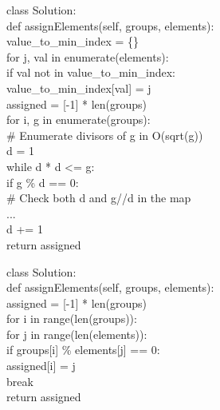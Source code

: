 \begin{tcolorbox}[
    colback=green!5,
    colframe=green!60!black,
    title={\textbf{Pairwise-Selected Solution (idx=12): Correct \checkmark}},
    coltitle=white,
    fonttitle=\small\bfseries,
    breakable,
    enhanced
]
\small\ttfamily
class Solution:\\
\quad def assignElements(self, groups, elements):\\
\quad\quad value\_to\_min\_index = \{\}\\
\quad\quad for j, val in enumerate(elements):\\
\quad\quad\quad if val not in value\_to\_min\_index:\\
\quad\quad\quad\quad value\_to\_min\_index[val] = j\\
\quad\quad assigned = [-1] * len(groups)\\
\quad\quad for i, g in enumerate(groups):\\
\quad\quad\quad \# Enumerate divisors of g in O(sqrt(g))\\
\quad\quad\quad d = 1\\
\quad\quad\quad while d * d <= g:\\
\quad\quad\quad\quad if g \% d == 0:\\
\quad\quad\quad\quad\quad \# Check both d and g//d in the map\\
\quad\quad\quad\quad\quad ...\\
\quad\quad\quad\quad d += 1\\
\quad\quad return assigned
\end{tcolorbox}

\begin{tcolorbox}[
    colback=red!5,
    colframe=red!60!black,
    title={\textbf{Pointwise-Selected Solution (idx=0): Incorrect (TLE) \ding{55}}},
    coltitle=white,
    fonttitle=\small\bfseries,
    breakable,
    enhanced
]
\small\ttfamily
class Solution:\\
\quad def assignElements(self, groups, elements):\\
\quad\quad assigned = [-1] * len(groups)\\
\quad\quad for i in range(len(groups)):\\
\quad\quad\quad for j in range(len(elements)):\\
\quad\quad\quad\quad if groups[i] \% elements[j] == 0:\\
\quad\quad\quad\quad\quad assigned[i] = j\\
\quad\quad\quad\quad\quad break\\
\quad\quad return assigned
\end{tcolorbox}

